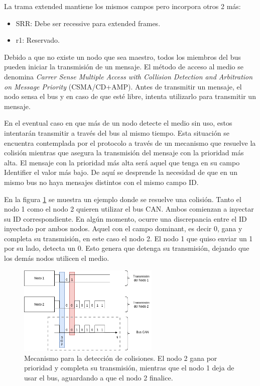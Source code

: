 La trama extended mantiene los mismos campos pero incorpora otros 2 más:

\begin{itemize}
    \item SRR: Debe ser recessive para extended frames.
    \item r1: Reservado.
\end{itemize}



Debido a que no existe un nodo que sea maestro, todos los miembros del bus pueden iniciar la transmisión de un mensaje. El método de acceso al medio se denomina \textit{Carrer Sense Multiple Access with Collision Detection and Arbitration on Message Priority} (CSMA/CD+AMP). Antes de transmitir un mensaje, el nodo sensa el bus y en caso de que esté libre, intenta utilizarlo para transmitir un mensaje.


En el eventual caso en que más de un nodo detecte el medio sin uso, estos intentarán transmitir a través del bus al mismo tiempo. Esta situación se encuentra contemplada por el protocolo a través de un mecanismo que resuelve la colisión mientras que asegura la transmisión del mensaje con la prioridad más alta. El mensaje con la prioridad más alta será aquel que tenga en su campo Identifier el valor más bajo. De aquí se desprende la necesidad de que en un mismo bus no haya mensajes distintos con el mismo campo ID.

En la figura \ref{fig:CAN_arbitration} se muestra un ejemplo donde se resuelve una colisión. Tanto el nodo 1 como el nodo 2 quieren utilizar el bus CAN. Ambos comienzan a inyectar su ID correspondiente. En algún momento, ocurre una discrepancia entre el ID inyectado por ambos nodos. Aquel con el campo dominant, es decir 0, gana y completa su transmisión, en este caso el nodo 2. El nodo 1 que quiso enviar un 1 por su lado, detecta un 0. Esto genera que detenga su transmisión, dejando que los demás nodos utilicen el medio.

\begin{figure}[H]
    \centering
    \includegraphics[width=0.6\textwidth]{img/CAN_arbitration.png}
    \caption{Mecanismo para la detección de colisiones. El nodo 2 gana por prioridad y completa su transmisión, mientras que el nodo 1 deja de usar el bus, aguardando a que el nodo 2 finalice.}
    \label{fig:CAN_arbitration}
\end{figure}

